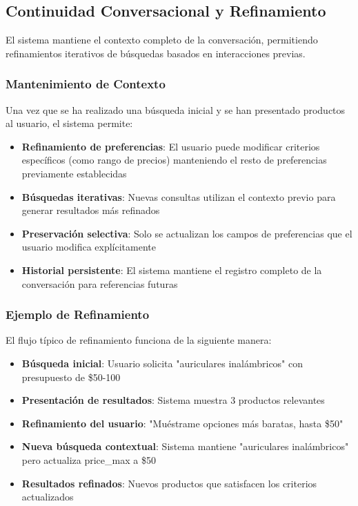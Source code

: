 \subsection{Continuidad Conversacional y Refinamiento}

El sistema mantiene el contexto completo de la conversación, permitiendo refinamientos iterativos de búsquedas basados en interacciones previas.

\subsubsection{Mantenimiento de Contexto}

Una vez que se ha realizado una búsqueda inicial y se han presentado productos al usuario, el sistema permite:

\begin{itemize}
    \item \textbf{Refinamiento de preferencias}: El usuario puede modificar criterios específicos (como rango de precios) manteniendo el resto de preferencias previamente establecidas
    \item \textbf{Búsquedas iterativas}: Nuevas consultas utilizan el contexto previo para generar resultados más refinados
    \item \textbf{Preservación selectiva}: Solo se actualizan los campos de preferencias que el usuario modifica explícitamente
    \item \textbf{Historial persistente}: El sistema mantiene el registro completo de la conversación para referencias futuras
\end{itemize}

\subsubsection{Ejemplo de Refinamiento}

El flujo típico de refinamiento funciona de la siguiente manera:

\begin{itemize}
    \item \textbf{Búsqueda inicial}: Usuario solicita "auriculares inalámbricos" con presupuesto de \$50-100
    \item \textbf{Presentación de resultados}: Sistema muestra 3 productos relevantes
    \item \textbf{Refinamiento del usuario}: "Muéstrame opciones más baratas, hasta \$50"
    \item \textbf{Nueva búsqueda contextual}: Sistema mantiene "auriculares inalámbricos" pero actualiza price\_max a \$50
    \item \textbf{Resultados refinados}: Nuevos productos que satisfacen los criterios actualizados
\end{itemize}

